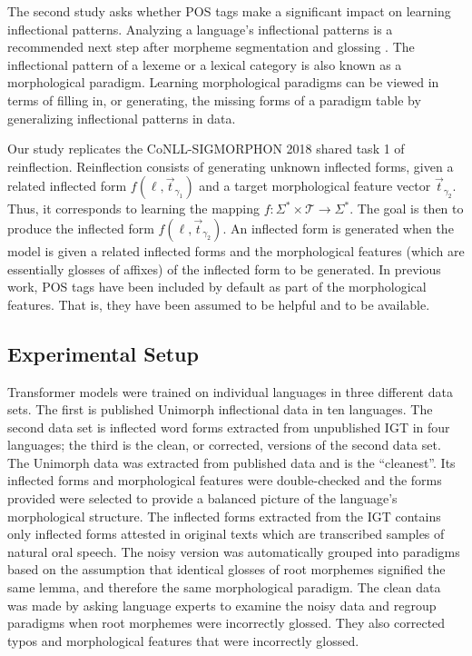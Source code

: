 The second study asks whether POS tags make a significant impact on learning inflectional patterns. Analyzing a language's inflectional patterns is a recommended next step after morpheme segmentation and glossing \citep{bird_machine_2012}. The inflectional pattern of a lexeme or a lexical category is also known as a morphological paradigm. Learning morphological paradigms can be viewed in terms of filling in, or generating, the missing forms of a paradigm table by generalizing inflectional patterns in data. 

Our study replicates the CoNLL-SIGMORPHON 2018 shared task 1 of reinflection. Reinflection consists of generating unknown inflected forms, given a related inflected form 
$f(\ell, \vec{t}_{\gamma_1})$ and a target morphological feature vector $\vec{t}_{\gamma_2}$. Thus, it corresponds to learning the mapping $f : \Sigma^* \times \mathcal{T} \to \Sigma^*$. The goal is then to produce the inflected form $f(\ell, \vec{t}_{\gamma_2})$. 
An inflected form is generated when the model is given a related inflected forms and the morphological features (which are essentially glosses of affixes) of the inflected form to be generated. 
In previous work, POS tags have been included by default as part of the morphological features. That is, they have been assumed to be helpful and to be available.


\subsection{Experimental Setup}
\label{sec:inflectionsetup}

Transformer models were trained on individual languages in three different data sets. The first is published Unimorph inflectional data in ten languages. The second data set is inflected word forms extracted from unpublished IGT in four languages; the third is the clean, or corrected, versions of the second data set. 
The Unimorph data was extracted from published data and is the ``cleanest''. Its inflected forms and morphological features were double-checked and the forms provided were selected to provide a balanced picture of the language's morphological structure. The inflected forms extracted from the IGT contains only inflected forms attested in original texts which are transcribed samples of natural oral speech. The noisy version was automatically grouped into paradigms based on the assumption that identical glosses of root morphemes signified the same lemma, and therefore the same morphological paradigm. The clean data was made by asking language experts to examine the noisy data and regroup paradigms when root morphemes were incorrectly glossed. They also corrected typos and morphological features that were incorrectly glossed. 

